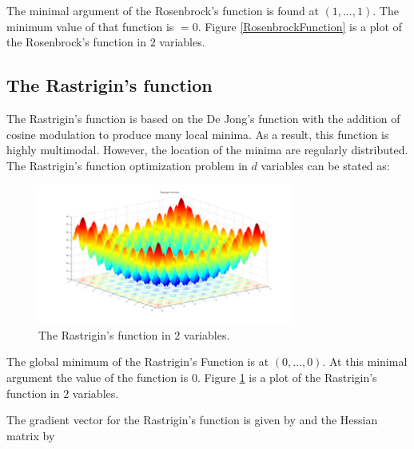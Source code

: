 The minimal argument of the Rosenbrock's function is found at
$(1, \ldots, 1)$. The minimum value of that
function is $= 0$. Figure \ref{RosenbrockFunction}
is a plot of the Rosenbrock's function in $2$ variables.

\subsection*{The Rastrigin's function}

The Rastrigin's function is based on the De Jong's function with the
addition of cosine modulation to produce many local minima. As a
result, this function is highly multimodal. However, the location of
the minima are regularly distributed. The Rastrigin's function
optimization problem in $d$ variables can be stated as:


\begin{figure}[h!]
\begin{center}
\includegraphics[width=0.75\textwidth]{function_optimization/rastrigin_function.png}
\caption{The Rastrigin's function in $2$
variables.}\label{RastriginFunction}
\end{center}
\end{figure}

The global minimum of the Rastrigin's Function is at $(0,\ldots,0)$. 
At this minimal argument the value of the function is
$0$. Figure \ref{RastriginFunction} is a plot of the
Rastrigin's function in $2$ variables.

The gradient vector for the Rastrigin's function is given by
\noindent and the Hessian matrix by


